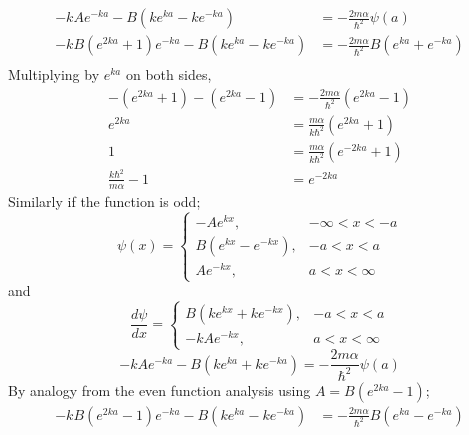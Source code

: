 \documentclass[addpoints]{exam}
\begin{document}
\begin{questions}
\begin{solution}
\begin{enumerate}
\[                  \]
                  \begin{align*}
                      -kAe^{-ka} - B(ke^{ka} - ke^{-ka})              & = -\frac{2m\alpha}{\hbar^2}\psi(a)             \\
                      -kB(e^{2ka} + 1)e^{-ka} - B(ke^{ka} - ke^{-ka}) & = -\frac{2m\alpha}{\hbar^2}B(e^{ka} + e^{-ka}) \\
                  \end{align*}
                  Multiplying by $e^{ka}$ on both sides,
                  \begin{align*}
                      -(e^{2ka} + 1) - (e^{2ka} - 1) & = -\frac{2m\alpha}{\hbar^2}(e^{2ka} - 1) \\
                      e^{2ka}                        & = \frac{m\alpha}{k\hbar^2}(e^{2ka} + 1)  \\
                      1                              & = \frac{m\alpha}{k\hbar^2}(e^{-2ka} + 1) \\
                      \frac{k\hbar^2}{m\alpha} - 1   & = e^{-2ka}
                  \end{align*}
                  Similarly if the function is odd;
                  \[
                      \psi(x) = \begin{cases}
                          -Ae^{kx},            & -\infty<x<-a \\
                          B(e^{kx} - e^{-kx}), & -a<x<a       \\
                          Ae^{-kx},            & a<x<\infty
                      \end{cases}
                  \]
                  and
                  \[
                      \frac{d\psi}{dx} = \begin{cases}
                          B(ke^{kx} + ke^{-kx}), & -a<x<a     \\
                          -kAe^{-kx},            & a<x<\infty
                      \end{cases}
                  \]
                  \[
                      -kAe^{-ka} - B(ke^{ka} + ke^{-ka}) = -\frac{2m\alpha}{\hbar^2}\psi(a)
                  \]
                  By analogy from the even function analysis using $A = B(e^{2ka} - 1)$;
                  \begin{align*}
                      -kB(e^{2ka} - 1)e^{-ka} - B(ke^{ka} - ke^{-ka}) & = -\frac{2m\alpha}{\hbar^2}B(e^{ka} - e^{-ka}) \\
                  \end{align*}

\end{enumerate}
\end{solution}
\end{questions}
\end{document}
